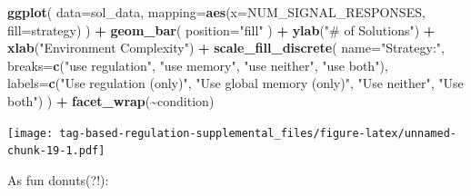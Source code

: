 \documentclass[
]{book}
\newenvironment{Shaded}{\begin{snugshade}}{\end{snugshade}}
\newcommand{\DataTypeTok}[1]{\textcolor[rgb]{0.13,0.29,0.53}{#1}}
\newcommand{\KeywordTok}[1]{\textcolor[rgb]{0.13,0.29,0.53}{\textbf{#1}}}
\newcommand{\NormalTok}[1]{#1}
\newcommand{\OperatorTok}[1]{\textcolor[rgb]{0.81,0.36,0.00}{\textbf{#1}}}
\newcommand{\StringTok}[1]{\textcolor[rgb]{0.31,0.60,0.02}{#1}}
\begin{document}
\begin{Shaded}
\begin{Highlighting}[]
\KeywordTok{ggplot}\NormalTok{( }\DataTypeTok{data=}\NormalTok{sol\_data, }\DataTypeTok{mapping=}\KeywordTok{aes}\NormalTok{(}\DataTypeTok{x=}\NormalTok{NUM\_SIGNAL\_RESPONSES, }\DataTypeTok{fill=}\NormalTok{strategy) ) }\OperatorTok{+}
\StringTok{  }\KeywordTok{geom\_bar}\NormalTok{(}
    \DataTypeTok{position=}\StringTok{"fill"}
\NormalTok{  ) }\OperatorTok{+}
\StringTok{  }\KeywordTok{ylab}\NormalTok{(}\StringTok{"\# of Solutions"}\NormalTok{) }\OperatorTok{+}
\StringTok{  }\KeywordTok{xlab}\NormalTok{(}\StringTok{"Environment Complexity"}\NormalTok{) }\OperatorTok{+}
\StringTok{  }\KeywordTok{scale\_fill\_discrete}\NormalTok{(}
    \DataTypeTok{name=}\StringTok{"Strategy:"}\NormalTok{,}
    \DataTypeTok{breaks=}\KeywordTok{c}\NormalTok{(}\StringTok{"use regulation"}\NormalTok{,}
             \StringTok{"use memory"}\NormalTok{,}
             \StringTok{"use neither"}\NormalTok{,}
             \StringTok{"use both"}\NormalTok{),}
    \DataTypeTok{labels=}\KeywordTok{c}\NormalTok{(}\StringTok{"Use regulation (only)"}\NormalTok{,}
             \StringTok{"Use global memory (only)"}\NormalTok{,}
             \StringTok{"Use neither"}\NormalTok{,}
             \StringTok{"Use both"}\NormalTok{)}
\NormalTok{    ) }\OperatorTok{+}
\StringTok{  }\KeywordTok{facet\_wrap}\NormalTok{(}\OperatorTok{\textasciitilde{}}\NormalTok{condition)}
\end{Highlighting}
\end{Shaded}

\texttt{[image: tag-based-regulation-supplemental\_files/figure-latex/unnamed-chunk-19-1.pdf]}

As fun donuts(?!):
\end{document}
